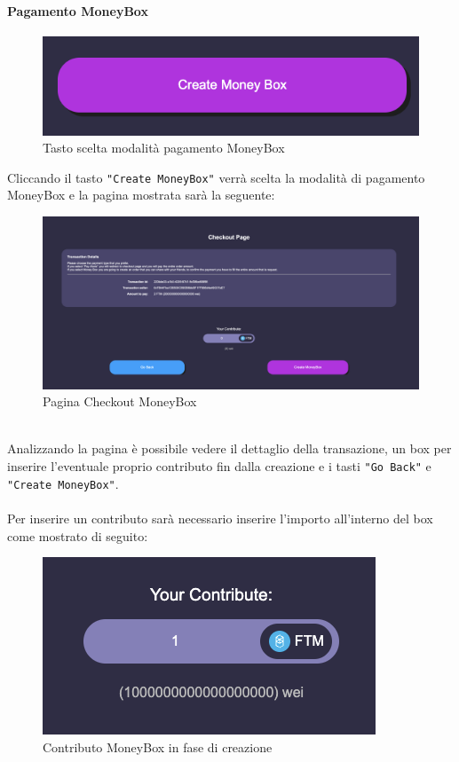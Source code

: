             \paragraph{Pagamento MoneyBox}
            \begin{figure}[H]
                \centering
                \includegraphics[scale=0.3]{immagini/Checkout/CreateMoneyBox.png}
                \caption{Tasto scelta modalità pagamento MoneyBox}
            \end{figure}
            Cliccando il tasto \texttt{"Create MoneyBox"} verrà scelta la modalità di pagamento MoneyBox e la pagina mostrata sarà la seguente:
            \begin{figure}[H]
                \centering
                \includegraphics[scale=0.2]{immagini/Checkout/MoneyBoxCheckout.png}
                \caption{Pagina Checkout MoneyBox}
            \end{figure}
            \textbf{}\\
            Analizzando la pagina è possibile vedere il dettaglio della transazione, un box per inserire l'eventuale proprio contributo fin dalla creazione e i tasti \texttt{"Go Back"} e \texttt{"Create MoneyBox"}.\\\\
            Per inserire un contributo sarà necessario inserire l'importo all'interno del box come mostrato di seguito:
            \begin{figure}[H]
                \centering
                \includegraphics[scale=0.4]{immagini/Checkout/InitialContribute.png}
                \caption{Contributo MoneyBox in fase di creazione}
            \end{figure}
